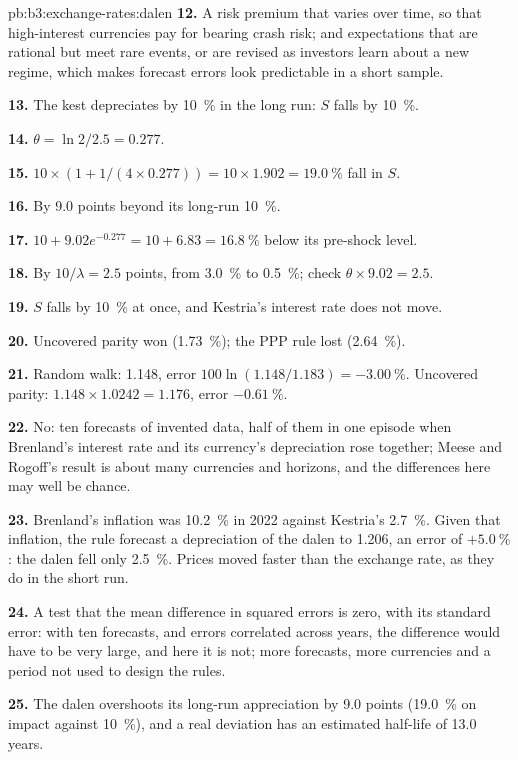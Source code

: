 \begin{solution}{pb:b3:exchange-rates:dalen}
\textbf{12.} A risk premium that varies over time, so that high-interest currencies
pay for bearing crash risk; and expectations that are rational but meet rare
events, or are revised as investors learn about a new regime, which makes forecast
errors look predictable in a short sample.

\textbf{13.} The kest depreciates by 10~\% in the long run: $S$ falls by 10~\%.

\textbf{14.} $\theta = \ln 2/2.5 = 0.277$.

\textbf{15.} $10 \times (1 + 1/(4 \times 0.277)) = 10 \times 1.902 = 19.0~\%$ fall in $S$.

\textbf{16.} By 9.0 points beyond its long-run 10~\%.

\textbf{17.} $10 + 9.02e^{-0.277} = 10 + 6.83 = 16.8~\%$ below its pre-shock level.

\textbf{18.} By $10/\lambda = 2.5$ points, from 3.0~\% to 0.5~\%; check $\theta \times 9.02 = 2.5$.

\textbf{19.} $S$ falls by 10~\% at once, and Kestria's interest rate does not move.

\textbf{20.} Uncovered parity won (1.73~\%); the PPP rule lost (2.64~\%).

\textbf{21.} Random walk: 1.148, error $100\ln(1.148/1.183) = -3.00~\%$. Uncovered parity:
$1.148 \times 1.0242 = 1.176$, error $-0.61~\%$.

\textbf{22.} No: ten forecasts of invented data, half of them in one episode when
Brenland's interest rate and its currency's depreciation rose together; Meese and
Rogoff's result is about many currencies and horizons, and the differences here
may well be chance.

\textbf{23.} Brenland's inflation was 10.2~\% in 2022 against Kestria's 2.7~\%. Given that
inflation, the rule forecast a depreciation of the dalen to 1.206, an error of
$+5.0~\%$: the dalen fell only 2.5~\%. Prices moved faster than the exchange rate, as they
do in the short run.

\textbf{24.} A test that the mean difference in squared errors is zero, with its
standard error: with ten forecasts, and errors correlated across years, the
difference would have to be very large, and here it is not; more forecasts, more
currencies and a period not used to design the rules.

\textbf{25.} The dalen overshoots its long-run appreciation by 9.0 points (19.0~\% on
impact against 10~\%), and a real deviation has an estimated half-life of 13.0 years.
\end{solution}
